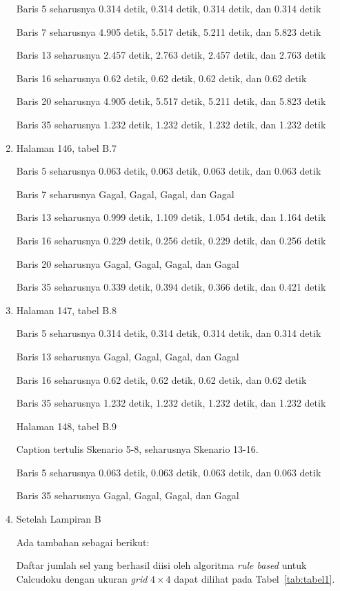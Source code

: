 \documentclass[11pt,a4paper,twoside,openright]{article}
\begin{document}
\begin{enumerate}
Baris 5 seharusnya 0.314 detik, 0.314 detik, 0.314 detik, dan 0.314 detik

Baris 7 seharusnya 4.905 detik, 5.517 detik, 5.211 detik, dan 5.823 detik

Baris 13 seharusnya 2.457 detik, 2.763 detik, 2.457 detik, dan 2.763 detik

Baris 16 seharusnya 0.62 detik, 0.62 detik, 0.62 detik, dan 0.62 detik

Baris 20 seharusnya 4.905 detik, 5.517 detik, 5.211 detik, dan 5.823 detik 

Baris 35 seharusnya 1.232 detik, 1.232 detik, 1.232 detik, dan 1.232 detik

\item Halaman 146, tabel B.7

Baris 5 seharusnya 0.063 detik, 0.063 detik, 0.063 detik, dan 0.063 detik

Baris 7 seharusnya Gagal, Gagal, Gagal, dan Gagal

Baris 13 seharusnya 0.999 detik, 1.109 detik, 1.054 detik, dan 1.164 detik

Baris 16 seharusnya 0.229 detik, 0.256 detik, 0.229 detik, dan 0.256 detik

Baris 20 seharusnya Gagal, Gagal, Gagal, dan Gagal

Baris 35 seharusnya 0.339 detik, 0.394 detik, 0.366 detik, dan 0.421 detik

\item Halaman 147, tabel B.8

Baris 5 seharusnya 0.314 detik, 0.314 detik, 0.314 detik, dan 0.314 detik

Baris 13 seharusnya Gagal, Gagal, Gagal, dan Gagal

Baris 16 seharusnya 0.62 detik, 0.62 detik, 0.62 detik, dan 0.62 detik

Baris 35 seharusnya 1.232 detik, 1.232 detik, 1.232 detik, dan 1.232 detik

Halaman 148, tabel B.9

Caption tertulis Skenario 5-8, seharusnya Skenario 13-16.

Baris 5 seharusnya 0.063 detik, 0.063 detik, 0.063 detik, dan 0.063 detik

Baris 35 seharusnya Gagal, Gagal, Gagal, dan Gagal

\item Setelah Lampiran B

Ada tambahan sebagai berikut:

Daftar jumlah sel yang berhasil diisi oleh algoritma \textit{rule based} untuk Calcudoku dengan ukuran \textit{grid} \begin{math}4 \times 4\end{math} dapat dilihat pada Tabel~\ref{tab:tabel1}.


\end{enumerate}
\end{document}
